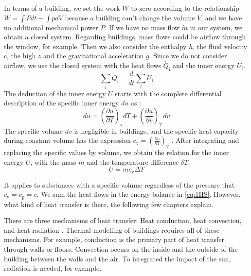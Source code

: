     In terms of a building, we set the work $\dot{W}$ to zero according to the relationship $W =\int Pdt - \int pdV$ \cite{Baehr.2016b} because a building can't change the volume $V$, and we have no additional mechanical power $P$. If we have no mass flow $\dot{m}$ in our system, we obtain a closed system. Regarding buildings, mass flows could be airflow through the window, for example. Then we also consider the enthalpy $h$, the fluid velocity $c$, the high $z$ and the gravitational acceleration $g$.
    \newline
    Since we do not consider airflow, we use the closed system with the heat flows $\dot{Q_\text{i}}$ and the inner energy $U_\text{l}$.
     \begin{equation}
        \label{eq:1HS}
        \sum_i \dot{Q_\text{i}}  = \frac{d}{dt} \sum_l U_\text{l}
    \end{equation}
    The deduction of the inner energy $U$  starts with the complete differential description of the specific inner energy $du$ as \cite{Baehr.2016b}:
    \begin {equation} 
    \label{eq:innerEnergy}
    du = (\frac{\partial u}{\partial T})_\text{v} dT + (\frac{\partial u}{\partial v})_\text{T} dv
    \end{equation}
    The specific volume $dv$ is negligible in buildings, and the specific heat capacity during constant volume has the expression $c_\text{v} = (\frac{\partial u}{\partial T})_\text{v}$ \cite{Baehr.2016b}. After integrating and replacing the specific values by volume, we obtain the relation for the inner energy $U$, with the mass $m$ and the temperature difference $\delta T$. 
        \begin{equation}
        \label{eq:innerEnergy}
        U = m c_\text{v} \Delta T
    \end{equation}
    
    It applies to substances with a specific volume regardless of the pressure that $c_\text{v}=c_\text{p}=c$. 
    We sum the heat flows in the energy balance in \autoref{eq:1HS}. However, what kind of heat transfer is there, the following few chapters explain.
    
    \vspace{2cm}
    
    There are three mechanisms of heat transfer: Heat conduction, heat convection, and heat radiation \cite{.2013}. Thermal modelling of buildings requires all of these mechanisms. For example, conduction is the primary part of heat transfer through walls or floors. Convection occurs on the inside and the outside of the building between the walls and the air. To integrated the impact of the sun, radiation is needed, for example.

